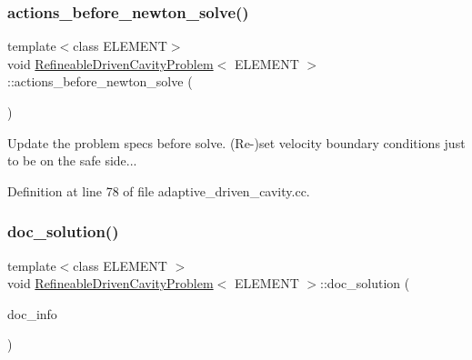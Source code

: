\mbox{\label{classRefineableDrivenCavityProblem_af83cad4653c7ac633538ebf46657659a}} 
\subsubsection{\texorpdfstring{actions\+\_\+before\+\_\+newton\+\_\+solve()}{actions\_before\_newton\_solve()}}
{\footnotesize\ttfamily template$<$class E\+L\+E\+M\+E\+NT$>$ \\
void \hyperlink{classRefineableDrivenCavityProblem}{Refineable\+Driven\+Cavity\+Problem}$<$ E\+L\+E\+M\+E\+NT $>$\+::actions\+\_\+before\+\_\+newton\+\_\+solve (\begin{DoxyParamCaption}{ }\end{DoxyParamCaption})\hspace{0.3cm}{\ttfamily [inline]}}



Update the problem specs before solve. (Re-\/)set velocity boundary conditions just to be on the safe side... 



Definition at line 78 of file adaptive\+\_\+driven\+\_\+cavity.\+cc.

\mbox{\label{classRefineableDrivenCavityProblem_a0baa1e8f1d1f6f73ef921b06a9b20836}} 
\subsubsection{\texorpdfstring{doc\+\_\+solution()}{doc\_solution()}}
{\footnotesize\ttfamily template$<$class E\+L\+E\+M\+E\+NT $>$ \\
void \hyperlink{classRefineableDrivenCavityProblem}{Refineable\+Driven\+Cavity\+Problem}$<$ E\+L\+E\+M\+E\+NT $>$\+::doc\+\_\+solution (\begin{DoxyParamCaption}\item[{Doc\+Info \&}]{doc\+\_\+info }\end{DoxyParamCaption})}



